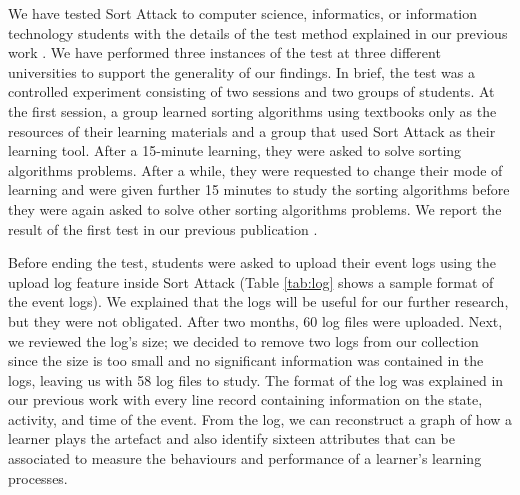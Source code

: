 \documentclass[conference]{IEEEtran}
\begin{document}
We have tested Sort Attack to computer science, informatics, or information technology students with the details of the test method explained in our previous work \cite{yohannis2015sort}. We have performed three instances of the test at three different universities to support the generality of our findings. In brief, the test was a controlled experiment consisting of two sessions and two groups of students. At the first session, a group learned sorting algorithms using textbooks only as the resources of their learning materials and a group that used Sort Attack as their learning tool. After a 15-minute learning, they were asked to solve sorting algorithms problems. After a while, they were requested to change their mode of learning and were given further 15 minutes to study the sorting algorithms before they were again asked to solve other sorting algorithms problems. We report the result of the first test in our previous publication \cite{yohannis2015sort}.

Before ending the test, students were asked to upload their event logs using the upload log feature inside Sort Attack (Table \ref{tab:log} shows a sample format of the event logs). We explained that the logs will be useful for our further research, but they were not obligated. After two months, 60 log files were uploaded. Next, we reviewed the log’s size; we decided to remove two logs from our collection since the size is too small and no significant information was contained in the logs, leaving us with 58 log files to study. The format of the log was explained in our previous work \cite{yohannis2015visualization} with every line record containing information on the state, activity, and time of the event. From the log, we can reconstruct a graph of how a learner plays the artefact and also  identify sixteen attributes that can be associated to measure the behaviours and performance of a learner’s learning processes. 
\end{document}
